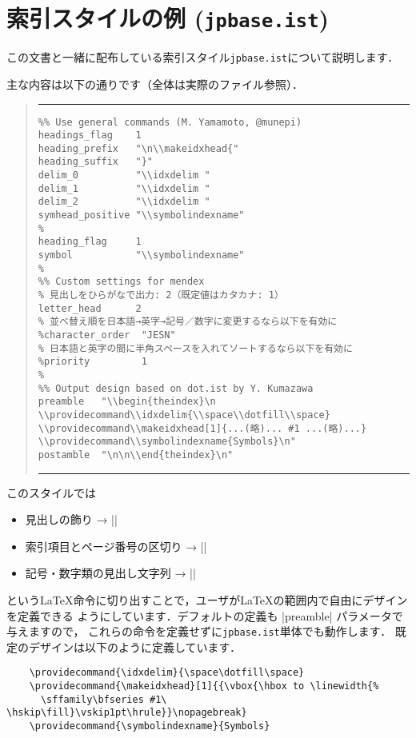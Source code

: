 \documentclass[a4paper,dvipdfmx]{jsarticle}
\newcommand{\FileName}[1]{\texttt{#1}}
\begin{document}
\clearpage
\appendix

\section{索引スタイルの例 (\FileName{jpbase.ist})}
この文書と一緒に配布している索引スタイル\FileName{jpbase.ist}について説明します．

主な内容は以下の通りです（全体は実際のファイル参照）．
\begin{quote}
\hrule\vskip10pt\noautospacing\noautoxspacing
\begin{verbatim}
%% Use general commands (M. Yamamoto, @munepi)
headings_flag    1
heading_prefix   "\n\\makeidxhead{"
heading_suffix   "}"
delim_0          "\\idxdelim "
delim_1          "\\idxdelim "
delim_2          "\\idxdelim "
symhead_positive "\\symbolindexname"
%
heading_flag     1
symbol           "\\symbolindexname"
%
%% Custom settings for mendex
% 見出しをひらがなで出力: 2（既定値はカタカナ: 1）
letter_head      2
% 並べ替え順を日本語→英字→記号／数字に変更するなら以下を有効に
%character_order  "JESN"
% 日本語と英字の間に半角スペースを入れてソートするなら以下を有効に
%priority         1
%
%% Output design based on dot.ist by Y. Kumazawa
preamble   "\\begin{theindex}\n
\\providecommand\\idxdelim{\\space\\dotfill\\space}
\\providecommand\\makeidxhead[1]{...(略)... #1 ...(略)...}
\\providecommand\\symbolindexname{Symbols}\n"
postamble  "\n\n\\end{theindex}\n"
\end{verbatim}
\vskip10pt\hrule
\end{quote}

このスタイルでは
\begin{itemize}
 \item 見出しの飾り → |\makeidxhead|
 \item 索引項目とページ番号の区切り → |\idxdelim|
 \item 記号・数字類の見出し文字列 → |\symbolindexname|
\end{itemize}
という\LaTeX 命令に切り出すことで，ユーザが\LaTeX の範囲内で自由にデザインを定義できる
ようにしています．デフォルトの定義も |preamble| パラメータで与えますので，
これらの命令を定義せずに\FileName{jpbase.ist}単体でも動作します．
既定のデザインは以下のように定義しています．
\begin{verbatim}
    \providecommand{\idxdelim}{\space\dotfill\space}
    \providecommand{\makeidxhead}[1]{{\vbox{\hbox to \linewidth{%
      \sffamily\bfseries #1\ \hskip\fill}\vskip1pt\hrule}}\nopagebreak}
    \providecommand{\symbolindexname}{Symbols}
\end{verbatim}
\end{document}
